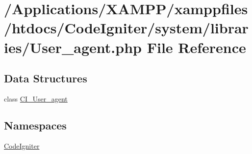 \hypertarget{_user__agent_8php}{}\section{/\+Applications/\+X\+A\+M\+P\+P/xamppfiles/htdocs/\+Code\+Igniter/system/libraries/\+User\+\_\+agent.php File Reference}
\label{_user__agent_8php}
\subsection*{Data Structures}
\begin{DoxyCompactItemize}
\item 
class \mbox{\hyperlink{class_c_i___user__agent}{C\+I\+\_\+\+User\+\_\+agent}}
\end{DoxyCompactItemize}
\subsection*{Namespaces}
\begin{DoxyCompactItemize}
\item 
 \mbox{\hyperlink{namespace_code_igniter}{Code\+Igniter}}
\end{DoxyCompactItemize}
